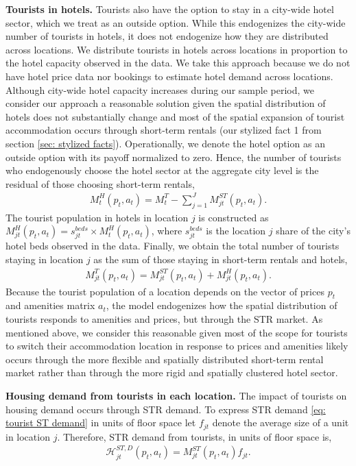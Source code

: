 \documentclass[11pt]{article}
\newcommand{\Paragraph}{\vspace{0.1cm}\noindent\textbf}
\begin{document}
\Paragraph{Tourists in hotels.} Tourists also have the option to stay in a city-wide hotel sector, which we treat as an outside option. While this endogenizes the city-wide number of tourists in hotels, it does not endogenize how they are distributed across locations. We distribute tourists in hotels across locations in proportion to the hotel capacity observed in the data. We take this approach because we do not have hotel price data nor bookings to estimate hotel demand across locations. Although city-wide hotel capacity increases during our sample period, we consider our approach a reasonable solution given the spatial distribution of hotels does not substantially change and most of the spatial expansion of tourist accommodation occurs through short-term rentals (our stylized fact 1 from section \ref{sec: stylized facts}). Operationally, we denote the hotel option as an outside option with its payoff normalized to zero. Hence, the number of tourists who endogenously choose the hotel sector at the aggregate city level is the residual of those choosing short-term rentals,
\begin{align*}
    M^H_{t}(p_t, a_t) = M_t^T - \sum_{j=1}^J M^{ST}_{jt}(p_t, a_t).
\end{align*}
The tourist population in hotels in location $j$ is constructed as $M^H_{jt}(p_t, a_t)= s_{jt}^{beds} \times M^H_{t}(p_t, a_t)$, where $s_{jt}^{beds}$ is the location $j$ share of the city's hotel beds observed in the data. Finally, we obtain the total number of tourists staying in location $j$ as the sum of those staying in short-term rentals and hotels,
\begin{align}\label{eq: tourist T demand}
    M^T_{jt}(p_t, a_t) =  M^{ST}_{jt}(p_t, a_t) +  M^H_{jt}(p_t, a_t).
\end{align}
Because the tourist population of a location depends on the vector of prices $p_t$ and amenities matrix $a_t$, the model endogenizes how the spatial distribution of tourists responds to amenities and prices, but through the STR market. As mentioned above, we consider this reasonable given most of the scope for tourists to switch their accommodation location in response to prices and amenities likely occurs through the more flexible and spatially distributed short-term rental market rather than through the more rigid and spatially clustered hotel sector.


\Paragraph{Housing demand from tourists in each location.} The impact of tourists on housing demand occurs through STR demand. To express STR demand \ref{eq: tourist ST demand} in units of floor space let $f_{jt}$ denote the average size of a unit in location $j$. Therefore, STR demand from tourists, in units of floor space is,
\begin{align}\label{eq: tourist ST demand - floor space}
\mathcal{H}^{ST,D}_{jt}(p_t, a_t) = M^{ST}_{jt}(p_t, a_t) f_{jt}.
\end{align}
\end{document}
